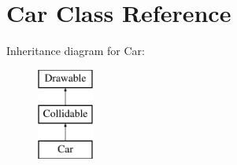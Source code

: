 \hypertarget{class_car}{}\section{Car Class Reference}
\label{class_car}
Inheritance diagram for Car\+:\begin{figure}[H]
\begin{center}
\leavevmode
\includegraphics[height=3.000000cm]{class_car}
\end{center}
\end{figure}
